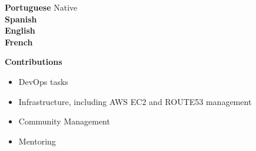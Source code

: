 \documentclass[9pt, green]{./template/developercv} %
\begin{document}

\vspace{-8mm}
\begin{minipage}[t]{0.28\textwidth}
	\vspace{-\baselineskip} %
	
	\vspace{1.2mm}
	\small \textbf{Portuguese} \hfill {\ssmall Native \hspace{3pt}} \\

	\vspace{-0.5mm}
	\small \textbf{Spanish} \hfill {} \\

	\vspace{-0.5mm}
	\small \textbf{English} \hfill {} \\
	
	\vspace{-0.5mm}
	\small \textbf{French} \hfill {} \\

\end{minipage}
\hfill
\begin{minipage}[t]{0.32\textwidth}
	\vspace{-\baselineskip} %
	
	\vspace{1.2mm}
	\textcolor{accentbackground}{\faGlobe}\hspace{0.5mm}  \small{\textbf{Contributions}} \\
	
	\vspace{-0.5mm}
	{\textbf{}}
	\vspace{-0.5mm}

\begin{itemize}[leftmargin=5.5mm]
    \item DevOps tasks
    \item Infrastructure, including AWS EC2 and ROUTE53 management
    \item Community Management
    \item Mentoring
    \end{itemize}

\end{minipage}
\end{document}
